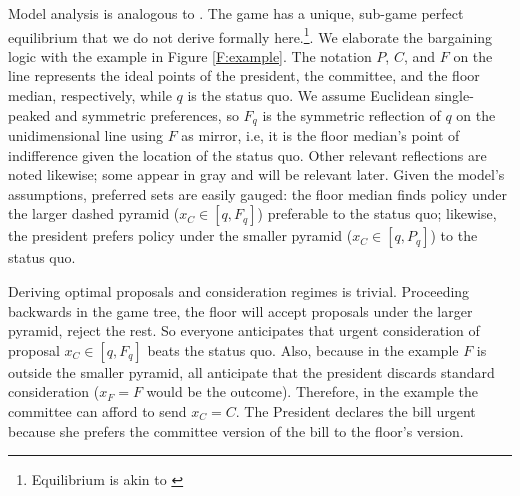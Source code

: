 \documentclass[letter,12pt]{article}
\begin{document}
Model analysis is analogous to \citet{dion.huber.1996}. The game has a unique, sub-game perfect equilibrium that we do not derive formally here.\footnote{Equilibrium is akin to \citet{magar.nd,romer.rosenthal.1978,cox.mccubbins.2005,gerber.1996}}. We elaborate the bargaining logic with the example in Figure \ref{F:example}. The notation $P$, $C$, and $F$ on the line represents the ideal points of the president, the committee, and the floor median, respectively, while $q$ is the status quo. We assume Euclidean single-peaked and symmetric preferences, so $F_q$ is the symmetric reflection of $q$ on the unidimensional line using $F$ as mirror, i.e, it is the floor median's point of indifference given the location of the status quo. Other relevant reflections are noted likewise; some appear in gray and will be relevant later. Given the model's assumptions, preferred sets are easily gauged: the floor median finds policy under the larger dashed pyramid ($x_C \in [q,F_q]$) preferable to the status quo; likewise, the president prefers policy under the smaller pyramid ($x_C \in [q,P_q]$) to the status quo. 

Deriving optimal proposals and consideration regimes is trivial. Proceeding backwards in the game tree, the floor will accept proposals under the larger pyramid, reject the rest. So everyone anticipates that urgent consideration of proposal $x_C \in [q,F_q]$ beats the status quo. Also, because in the example $F$ is outside the smaller pyramid, all anticipate that the president discards standard consideration ($x_F=F$ would be the outcome). Therefore, in the example the committee can afford to send $x_C=C$. The President declares the bill urgent because she prefers the committee version of the bill to the floor's version. 
\end{document}
